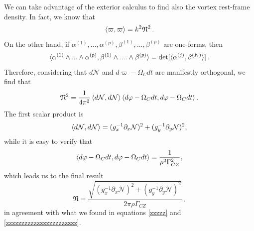 \documentclass[usenatbib%
]{mnras}
\begin{document}
We can take advantage of the exterior calculus to find also the vortex rest-frame density. 
In fact, we know that 
\begin{equation}
\braket{\varpi, \varpi } = k^2 \mathfrak{N}^2 \, .
\end{equation}
On the other hand,  if $\alpha^{(1)}, ... ,\alpha^{(p)}, \beta^{(1)},...,\beta^{(p)}$ are one-forms, then
\begin{equation}
\braket{\alpha^{(1)} \wedge ... \wedge \alpha^{(p)}, \beta^{(1)}\wedge .... \wedge \beta^{(p)}} = \det [\braket{\alpha^{(j)},\beta^{(K)}}] \, .
\end{equation}
Therefore, considering that $d\mathcal{N}$ and $d\varpi - \Omega_C dt$ are manifestly orthogonal, we find that
\begin{equation}
\mathfrak{N}^2 = \dfrac{1}{4 \pi^2}\braket{d\mathcal{N}, d \mathcal{N}} \braket{d\varphi - \Omega_C dt,d\varphi - \Omega_C dt}.
\end{equation}
The first scalar product is  
\begin{equation}
\braket{d\mathcal{N}, d \mathcal{N}} = (g_x^{-1}\partial_x \mathcal{N})^2 + (g_y^{-1}\partial_y \mathcal{N})^2,
\end{equation}
while  it is easy to verify that
\begin{equation}
\braket{d\varphi - \Omega_C dt,d\varphi - \Omega_C dt} = \dfrac{1}{\rho^2 \Gamma_{CZ}^2},
\end{equation}
which leads us to the final result
\begin{equation}
\mathfrak{N} =\dfrac{\sqrt{ (g_x^{-1}\partial_x \mathcal{N})^2 + (g_y^{-1}\partial_y \mathcal{N})^2  }}{2\pi \rho \Gamma_{CZ}} \, ,
\end{equation}
in agreement with what we found in equations \eqref{zzzzz} and \eqref{zzzzzzzzzzzzzzzzzzzzzzz}.







\bsp
\label{lastpage}
\end{document}
